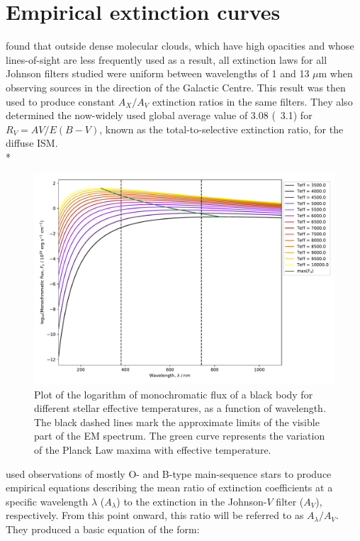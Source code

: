 \documentclass[12pt, a4paper]{report}
\begin{document}
\section{Empirical extinction curves}
\cite{1985ApJ...288..618R} found that outside dense molecular clouds, which have high opacities and whose lines-of-sight are less frequently used as a result, all extinction laws for all Johnson filters studied were uniform between wavelengths of 1 and 13 $\mu$m when observing sources in the direction of the Galactic Centre. This result was then used to produce constant $A_{X}/A_{V}$ extinction ratios in the same filters. They also determined the now-widely used global average value of 3.08 (~3.1) for $R_{V} = A{V}/E(B-V)$, known as the total-to-selective extinction ratio,  for the diffuse ISM. \\*


\begin{figure}[h]
\begin{center}
\includegraphics[width=1.0\textwidth]{blackbody_teff_logF_illustration.pdf}
\caption{Plot of the logarithm of monochromatic flux of a black body for different stellar effective temperatures, as a function of wavelength. The black dashed lines mark the approximate limits of the visible part of the EM spectrum. The green curve represents the variation of the Planck Law maxima with effective temperature.}
\label{planck_curve}
\end{center}
\end{figure}

\cite{1989ApJ...345..245C} used observations of mostly O- and B-type main-sequence stars to produce empirical equations describing the mean ratio of extinction coefficients at a specific wavelength $\lambda$ ($A_{\lambda}$) to the extinction in the Johnson-$V$ filter ($A_{V}$), respectively. From this point onward, this ratio will be referred to as $A_{\lambda}/A_{V}$. They produced a basic equation of the form:
\end{document}
